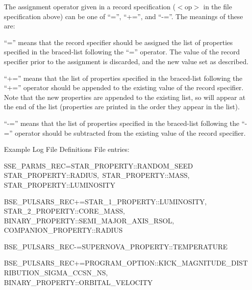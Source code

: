The assignment operator given in a record specification ($\mathrm{<}$op$\mathrm{>}$ in the file specification above) can be one of ``='', ``+='', and ``-=''.  The meanings of these are:

\bigskip
\hfill
\begin{minipage}{\dimexpr\textwidth-1.5cm}
``='' means that the record specifier should be assigned the list of properties specified in the braced-list following the ``='' operator. The value of the record specifier prior to the assignment is discarded, and the new value set as described.
\end{minipage}

\bigskip
\hfill
\begin{minipage}{\dimexpr\textwidth-1.5cm}
``+='' means that the list of properties specified in the braced-list following the ``+='' operator should be appended to the existing value of the record specifier. Note that the new properties are appended to the existing list, so will appear at the end of the list (properties are printed in the order they appear in the list).
\end{minipage}

\bigskip
\hfill
\begin{minipage}{\dimexpr\textwidth-1.5cm}
``-='' means that the list of properties specified in the braced-list following the ``-='' operator should be subtracted from the existing value of the record specifier.
\end{minipage}

\bigskip
Example Log File Definitions File entries:
\bigskip

\small
SSE\_PARMS\_REC\tabto{9.65em}=\tabto{11em}\lcb\tabto{11.6em}STAR\_PROPERTY::RANDOM\_SEED \\
\tabto{11.6em}STAR\_PROPERTY::RADIUS,\ STAR\_PROPERTY::MASS,
\tabto{11.6em}STAR\_PROPERTY::LUMINOSITY\ \rcb

\medskip
BSE\_PULSARS\_REC\tabto{9em}+=\tabto{11em}\lcb\tabto{11.6em}STAR\_1\_PROPERTY::LUMINOSITY, \\
\tabto{11.6em}STAR\_2\_PROPERTY::CORE\_MASS, \\
\tabto{11.6em}BINARY\_PROPERTY::SEMI\_MAJOR\_AXIS\_RSOL, \\
\tabto{11.6em}COMPANION\_PROPERTY::RADIUS\ \rcb

\medskip
BSE\_PULSARS\_REC\tabto{9em}-=\tabto{11em}\lcb\tabto{11.6em}SUPERNOVA\_PROPERTY::TEMPERATURE\ \rcb

\medskip
BSE\_PULSARS\_REC\tabto{9em}+=\tabto{11em}\lcb\tabto{11.6em}PROGRAM\_OPTION::KICK\_MAGNITUDE\_DISTRIBUTION\_SIGMA\_CCSN\_NS,
\tabto{11.6em}BINARY\_PROPERTY::ORBITAL\_VELOCITY\ \rcb

